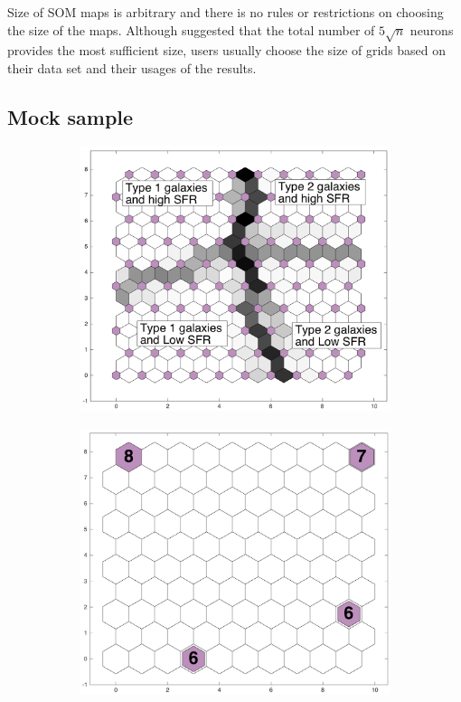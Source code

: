 \documentclass[useAMS,usenatbib]{mn2e}
\begin{document}
    Size of SOM maps is arbitrary and there is no rules or restrictions on choosing the size of the maps. 
    Although \cite{Vesanto05} suggested that the total number of  $5\sqrt{n}$ neurons provides the most sufficient size, users usually choose the size of grids based on their data set and their usages of the results.

   
\subsection{Mock sample}
 
         \begin{figure}
            \begin{subfigure}[b]{0.5\textwidth}
                \centering
                \includegraphics[width=\textwidth]{images0.01/sample/sample2_dist.png}
            \end{subfigure}
            \hfill
            \begin{subfigure}[b]{0.5\textwidth}
                \includegraphics[width=\textwidth]{images0.01/sample/sample2_hits.png}

\end{subfigure}
\end{figure}
\end{document}
